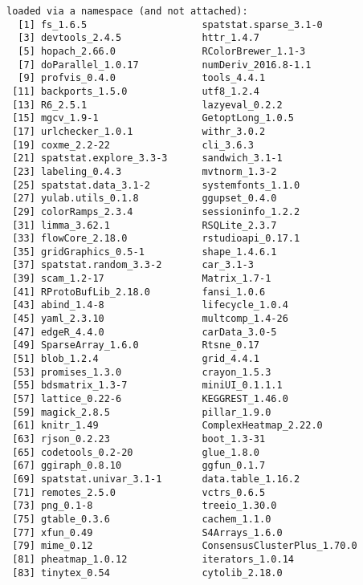 \documentclass[
  letterpaper,
  DIV=11,
  numbers=noendperiod]{scrreprt}
\begin{document}
\begin{verbatim}
loaded via a namespace (and not attached):
  [1] fs_1.6.5                    spatstat.sparse_3.1-0      
  [3] devtools_2.4.5              httr_1.4.7                 
  [5] hopach_2.66.0               RColorBrewer_1.1-3         
  [7] doParallel_1.0.17           numDeriv_2016.8-1.1        
  [9] profvis_0.4.0               tools_4.4.1                
 [11] backports_1.5.0             utf8_1.2.4                 
 [13] R6_2.5.1                    lazyeval_0.2.2             
 [15] mgcv_1.9-1                  GetoptLong_1.0.5           
 [17] urlchecker_1.0.1            withr_3.0.2                
 [19] coxme_2.2-22                cli_3.6.3                  
 [21] spatstat.explore_3.3-3      sandwich_3.1-1             
 [23] labeling_0.4.3              mvtnorm_1.3-2              
 [25] spatstat.data_3.1-2         systemfonts_1.1.0          
 [27] yulab.utils_0.1.8           ggupset_0.4.0              
 [29] colorRamps_2.3.4            sessioninfo_1.2.2          
 [31] limma_3.62.1                RSQLite_2.3.7              
 [33] flowCore_2.18.0             rstudioapi_0.17.1          
 [35] gridGraphics_0.5-1          shape_1.4.6.1              
 [37] spatstat.random_3.3-2       car_3.1-3                  
 [39] scam_1.2-17                 Matrix_1.7-1               
 [41] RProtoBufLib_2.18.0         fansi_1.0.6                
 [43] abind_1.4-8                 lifecycle_1.0.4            
 [45] yaml_2.3.10                 multcomp_1.4-26            
 [47] edgeR_4.4.0                 carData_3.0-5              
 [49] SparseArray_1.6.0           Rtsne_0.17                 
 [51] blob_1.2.4                  grid_4.4.1                 
 [53] promises_1.3.0              crayon_1.5.3               
 [55] bdsmatrix_1.3-7             miniUI_0.1.1.1             
 [57] lattice_0.22-6              KEGGREST_1.46.0            
 [59] magick_2.8.5                pillar_1.9.0               
 [61] knitr_1.49                  ComplexHeatmap_2.22.0      
 [63] rjson_0.2.23                boot_1.3-31                
 [65] codetools_0.2-20            glue_1.8.0                 
 [67] ggiraph_0.8.10              ggfun_0.1.7                
 [69] spatstat.univar_3.1-1       data.table_1.16.2          
 [71] remotes_2.5.0               vctrs_0.6.5                
 [73] png_0.1-8                   treeio_1.30.0              
 [75] gtable_0.3.6                cachem_1.1.0               
 [77] xfun_0.49                   S4Arrays_1.6.0             
 [79] mime_0.12                   ConsensusClusterPlus_1.70.0
 [81] pheatmap_1.0.12             iterators_1.0.14           
 [83] tinytex_0.54                cytolib_2.18.0             

\end{verbatim}
\end{document}
